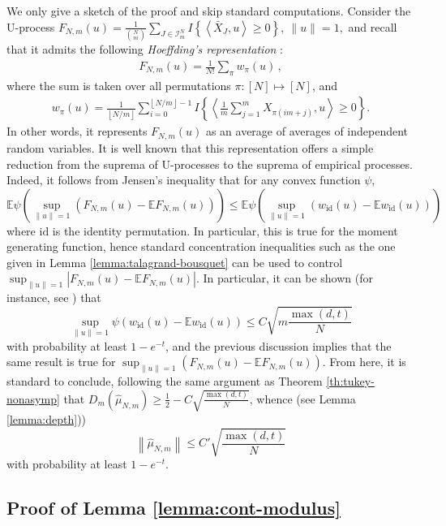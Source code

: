 \documentclass[12pt]{article}
\newcommand{\wh}{\widehat}
\def\l{\left}
\def\r{\right}
\newcommand{\mb}{\mathbb}
\newcommand{\dotp}[2]{\left\langle#1,#2\right\rangle}
\theoremstyle{thmstyletwo}%
\theoremstyle{thmstylethree}%
\begin{document}
We only give a sketch of the proof and skip standard computations. Consider the U-process
\(
F_{N,m}(u)=\frac{1}{{N \choose m}} \sum_{J \in \mathcal{I}^N_m} I\left\{ \dotp{\bar X_J}{u}\geq 0\right\}, \ \|u\|=1,
\)
and recall that it admits the following \emph{Hoeffding's representation} \citep{hoeffding1994probability}: 
    \begin{align*}
        F_{N,m}(u) = \frac{1}{N!} \sum_\pi w_{\pi}(u)\,,
    \end{align*}
    where the sum is taken over all permutations $\pi: [N] \mapsto [N]$, and
    \begin{align*}
        w_{\pi}(u) = \frac{1}{\l\lfloor N/m \r\rfloor}\sum_{i=0}^{\l\lfloor N/m \r\rfloor-1} I\left\{ \dotp{\frac{1}{m}\sum_{j=1}^m X_{\pi(im+j)}}{u}\geq 0\right\}.
     \end{align*}
In other words, it represents $F_{N,m}(u)$ as an average of averages of independent random variables. It is well known that this representation offers a simple reduction from the suprema of U-processes to the suprema of empirical processes. Indeed, it follows from Jensen's inequality that for any convex function $\psi$, 
\[
\mb E\psi\l(\sup_{\|u\|=1}(F_{N,m}(u)-\mb EF_{N,m}(u))\r)\leq \mb E \psi\l(\sup_{\|u\|=1}(w_{\mathrm{id}}(u)-\mb Ew_{\mathrm{id}}(u))\r)
\]
where $\mathrm{id}$ is the identity permutation. In particular, this is true for the moment generating function, hence standard concentration inequalities such as the one given in Lemma \ref{lemma:talagrand-bousquet} can be used to control $\sup_{\|u\|=1 }\l| F_{N,m}(u)-\mb EF_{N,m}(u) \r|$. 
In particular, it can be shown (for instance, see \citep[Theorem 2.1]{chen2018robust}) that 
\[
\sup_{\|u\|=1} \psi\l(w_{\mathrm{id}}(u)-\mb Ew_{\mathrm{id}}(u)\r)\leq C\sqrt{m\frac{\max(d,t)}{N}}
\]
with probability at least $1-e^{-t}$, and the previous discussion implies that the same result is true for $\sup_{\|u\|=1}(F_{N,m}(u)-\mb EF_{N,m}(u))$. From here, it is standard to conclude, following the same argument as Theorem \ref{th:tukey-nonasymp} that $D_{m}(\wh\mu_{N,m})\geq \frac{1}{2} - C\sqrt{\frac{\max(d,t)}{N}}$, whence (see Lemma \ref{lemma:depth}))
\[
\l\|\wh\mu_{N,m}\r\|\leq C'\sqrt{\frac{\max(d,t)}{N}}
\]
with probability at least $1-e^{-t}$.

\subsection{Proof of Lemma \ref{lemma:cont-modulus}}
\label{section:proof:cont-modulus}
\end{document}
